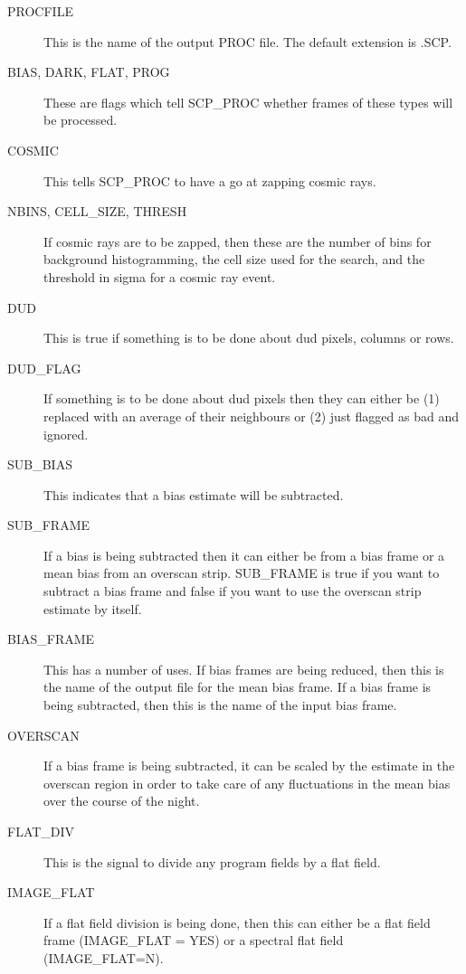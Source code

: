 \begin{description}

\item [PROCFILE] This is the name of the output PROC file.  The default
extension is .SCP.

\item [BIAS, DARK, FLAT, PROG] These are flags which tell SCP\_PROC whether
frames of these types will be processed.

\item [COSMIC] This tells SCP\_PROC to have a go at zapping cosmic rays.

\item [NBINS, CELL\_SIZE, THRESH] If cosmic rays are to be zapped, then these
are the number of bins for background histogramming, the cell size used for the
search, and the threshold in sigma for a cosmic ray event.

\item [DUD] This is true if something is to be done about dud pixels, columns
or rows.

\item [DUD\_FLAG] If something is to be done about dud pixels then they can
either be (1) replaced with an average of their neighbours or (2) just flagged
as bad and ignored.

\item [SUB\_BIAS] This indicates that a bias estimate will be subtracted.

\item [SUB\_FRAME] If a bias is being subtracted then it can either be from a
bias frame or a mean bias from an overscan strip.  SUB\_FRAME is true if  you
want to subtract a bias frame and false if you want to use the  overscan strip
estimate by itself.

\item [BIAS\_FRAME] This has a number of uses.  If bias frames are being
reduced, then this is the name of the output file for the mean bias frame. If a
bias frame is being subtracted, then this is the name of the input bias frame.

\item [OVERSCAN] If a bias frame is being subtracted, it can be scaled by the
estimate in the overscan region in order to take care of any fluctuations in
the mean bias over the course of the night.

\item [FLAT\_DIV] This is the signal to divide any program fields by a flat
field.

\item [IMAGE\_FLAT] If a flat field division is being done, then this can
either be a flat field frame (IMAGE\_FLAT = YES) or a spectral flat field
(IMAGE\_FLAT=N).


\end{description}

